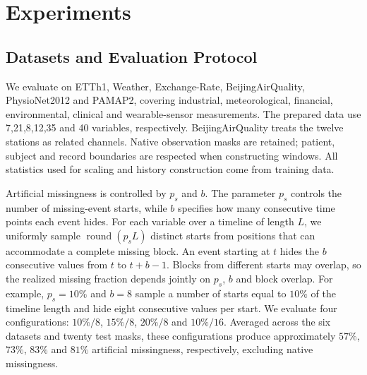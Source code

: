 \begin{table}[!t]
 \centering\scriptsize\setlength{\tabcolsep}{3pt}\renewcommand{\arraystretch}{1.03}
 
 \caption{Imputation results across six datasets and four missingness configurations. Each training run averages twenty shared test masks; \Model{} reports the average over training seeds2023,2024 and 2025, while baselines retain their original training seeds. Best results are red; second-best results are blue and underlined.}
 \label{tab:formal}
\end{table}

\section{Experiments}\label{sec:experiments}
\subsection{Datasets and Evaluation Protocol}
We evaluate \Model{} on ETTh1, Weather, Exchange-Rate, BeijingAirQuality, PhysioNet2012 and PAMAP2, covering industrial, meteorological, financial, environmental, clinical and wearable-sensor measurements. The prepared data use 7,21,8,12,35 and 40 variables, respectively. BeijingAirQuality treats the twelve stations as related channels. Native observation masks are retained; patient, subject and record boundaries are respected when constructing windows. All statistics used for scaling and history construction come from training data.

Artificial missingness is controlled by $p_s$ and $b$. The parameter $p_s$ controls the number of missing-event starts, while $b$ specifies how many consecutive time points each event hides. For each variable over a timeline of length $L$, we uniformly sample $\operatorname{round}(p_sL)$ distinct starts from positions that can accommodate a complete missing block. An event starting at $t$ hides the $b$ consecutive values from $t$ to $t+b-1$. Blocks from different starts may overlap, so the realized missing fraction depends jointly on $p_s$, $b$ and block overlap. For example, $p_s=10\%$ and $b=8$ sample a number of starts equal to $10\%$ of the timeline length and hide eight consecutive values per start. We evaluate four configurations: $10\%/8$, $15\%/8$, $20\%/8$ and $10\%/16$. Averaged across the six datasets and twenty test masks, these configurations produce approximately $57\%$, $73\%$, $83\%$ and $81\%$ artificial missingness, respectively, excluding native missingness.

